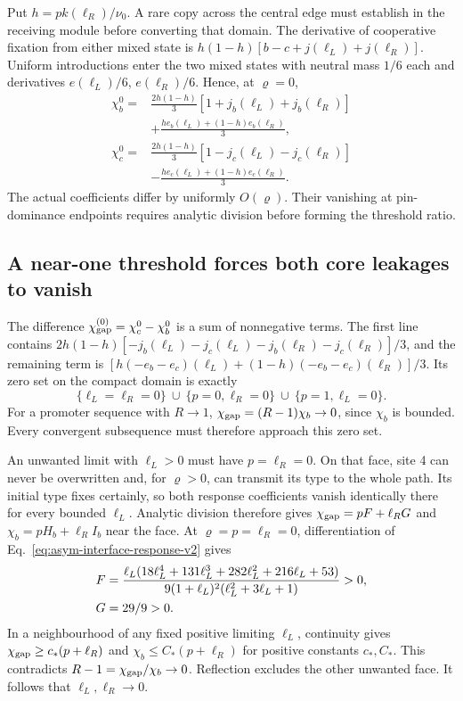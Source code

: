 \documentclass[aps,pre,reprint,amsmath,amssymb,longbibliography]{revtex4-2}
\begin{document}
Put $h=p k(\ell_R)/\nu_0$. A rare copy across the central edge
must establish in the receiving module before converting that domain.
The derivative of cooperative fixation from either mixed state is
$h(1-h)[b-c+j(\ell_L)+j(\ell_R)]$. Uniform introductions enter
the two mixed states with neutral mass $1/6$ each and derivatives
$e(\ell_L)/6$, $e(\ell_R)/6$. Hence, at $\varrho=0$,
\begin{equation}
 \begin{aligned}
 \chi_b^0={}&\frac{2h(1-h)}3[1+j_b(\ell_L)+j_b(\ell_R)]\\
 &+\frac{h e_b(\ell_L)+(1-h)e_b(\ell_R)}3,\\
 \chi_c^0={}&\frac{2h(1-h)}3[1-j_c(\ell_L)-j_c(\ell_R)]\\
 &-\frac{h e_c(\ell_L)+(1-h)e_c(\ell_R)}3.
 \end{aligned}
 \label{eq:asym-interface-response-v2}
\end{equation}
The actual coefficients differ by uniformly $O(\varrho)$. Their
vanishing at pin-dominance endpoints requires analytic division before
forming the threshold ratio.

\subsection{A near-one threshold forces both core leakages to vanish}

The difference $\chi_{\rm gap}^{(0)}=\chi_c^0-\chi_b^0$ is a sum of
nonnegative terms. The first line contains
$2h(1-h)[-j_b(\ell_L)-j_c(\ell_L)-j_b(\ell_R)-j_c(\ell_R)]/3$,
and the remaining term is
$[h(-e_b-e_c)(\ell_L)+(1-h)(-e_b-e_c)(\ell_R)]/3$.
Its zero set on the compact domain is exactly
\begin{equation}
 \{\ell_L=\ell_R=0\}\ \cup\
 \{p=0,\ell_R=0\}\ \cup\
 \{p=1,\ell_L=0\}.
 \label{eq:asym-deficit-zero-set-v2}
\end{equation}
For a promoter sequence with $R\to1$,
$\chi_{\rm gap}=(R-1)\chi_b\to0$, since $\chi_b$ is bounded.
Every convergent subsequence must therefore approach this zero set.

An unwanted limit with $\ell_L>0$ must have $p=\ell_R=0$.
On that face, site 4 can never be overwritten and, for
$\varrho>0$, can transmit its type to the whole path. Its initial
type fixes certainly, so both response coefficients vanish identically
there for every bounded $\ell_L$. Analytic division therefore gives
$\chi_{\rm gap}=pF+\ell_R G$ and
$\chi_b=pH_b+\ell_R I_b$ near the face. At
$\varrho=p=\ell_R=0$, differentiation of
Eq.~\eqref{eq:asym-interface-response-v2} gives
 \begin{align}
F&=\frac{\ell_L(18\ell_L^4+131\ell_L^3+282\ell_L^2
                              +216\ell_L+53)}
 {9(1+\ell_L)^2(\ell_L^2+3\ell_L+1)}>0, \notag \\
 G&=29/9>0. \label{eq:asym-endpoint-derivative-v2}
 \end{align}
In a neighbourhood of any fixed positive limiting $\ell_L$,
continuity gives $\chi_{\rm gap}\ge c_*(p+\ell_R)$ and
$\chi_b\le C_*(p+\ell_R)$ for positive constants $c_*,C_*$.
This contradicts $R-1=\chi_{\rm gap}/\chi_b\to0$. Reflection excludes
the other unwanted face. It follows that $\ell_L,\ell_R\to0$.
\end{document}
